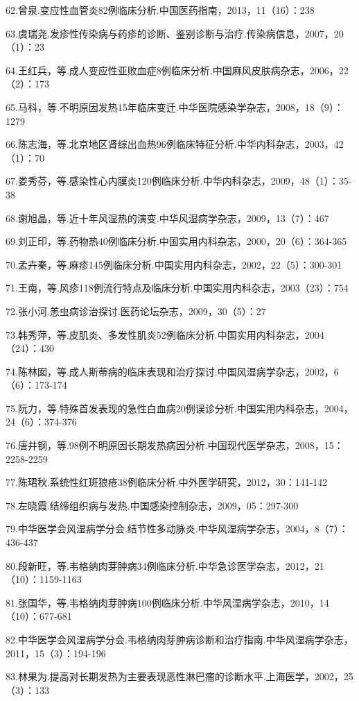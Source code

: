 62.曾泉.变应性血管炎82例临床分析.中国医药指南，2013，11（16）：238

63.虞瑞尧.发疹性传染病与药疹的诊断、鉴别诊断与治疗.传染病信息，2007，20（1）：23

64.王红兵，等.成人变应性亚败血症8例临床分析.中国麻风皮肤病杂志，2006，22（2）：173

65.马科，等.不明原因发热15年临床变迁.中华医院感染学杂志，2008，18（9）：1279

66.陈志海，等.北京地区肾综出血热96例临床特征分析.中华内科杂志，2003，42（1）：70

67.娄秀芬，等.感染性心内膜炎120例临床分析.中华内科杂志，2009，48（1）：35-38

68.谢旭晶，等.近十年风湿热的演变.中华风湿病学杂志，2009，13（7）：467

69.刘正印，等.药物热40例临床分析.中国实用内科杂志，2000，20（6）：364-365

70.孟卉秦，等.麻疹145例临床分析.中国实用内科杂志，2002，22（5）：300-301

71.王南，等.风疹118例流行特点及临床分析.中国实用内科杂志，2003（23）：754

72.张小河.恙虫病诊治探讨.医药论坛杂志，2009，30（5）：27

73.韩秀萍，等.皮肌炎、多发性肌炎52例临床分析.中国实用内科杂志，2004（24）：430

74.陈林囡，等.成人斯蒂病的临床表现和治疗探讨.中国风湿病学杂志，2002，6（6）：173-174

75.阮力，等.特殊首发表现的急性白血病20例误诊分析.中国实用内科杂志，2004，24（6）：374-376

76.唐井钢，等.98例不明原因长期发热病因分析.中国现代医学杂志，2008，15：2258-2259

77.陈珺秋.系统性红斑狼疮38例临床分析.中外医学研究，2012，30：141-142

78.左晓霞.结缔组织病与发热.中国感染控制杂志，2009，05：297-300

79.中华医学会风湿病学分会.结节性多动脉炎.中华风湿病学杂志，2004，8（7）：436-437

80.段新旺，等.韦格纳肉芽肿病34例临床分析.中华急诊医学杂志，2012，21（10）：1159-1163

81.张国华，等.韦格纳肉芽肿病100例临床分析.中华风湿病学杂志，2010，14（10）：677-681

82.中华医学会风湿病学分会.韦格纳肉芽肿病诊断和治疗指南.中华风湿病学杂志，2011，15（3）：194-196

83.林果为.提高对长期发热为主要表现恶性淋巴瘤的诊断水平.上海医学，2002，25（3）：133

